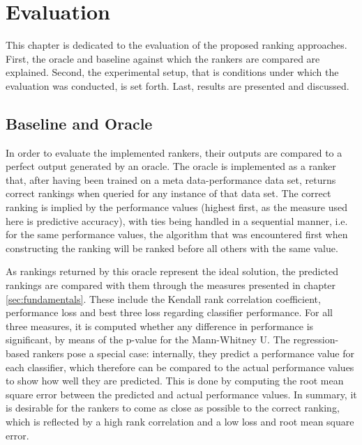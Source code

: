 \chapter{Evaluation}
\label{sec:evaluation}

This chapter is dedicated to the evaluation of the proposed ranking approaches. First, the oracle and baseline against which the rankers are compared are explained. Second, the experimental setup, that is conditions under which the evaluation was conducted, is set forth. Last, results are presented and discussed.

\section{Baseline and Oracle}
In order to evaluate the implemented rankers, their outputs are compared to a perfect output generated by an oracle. The oracle is implemented as a ranker that, after having been trained on a meta data-performance data set, returns correct rankings when queried for any instance of that data set. The correct ranking is implied by the performance values (highest first, as the measure used here is predictive accuracy), with ties being handled in a sequential manner, i.e. for the same performance values, the algorithm that was encountered first when constructing the ranking will be ranked before all others with the same value.

As rankings returned by this oracle represent the ideal solution, the predicted rankings are compared with them through the measures presented in chapter \ref{sec:fundamentals}. These include the Kendall rank correlation coefficient, performance loss and best three loss regarding classifier performance. For all three measures, it is computed whether any difference in performance is significant, by means of the p-value for the Mann-Whitney U. The regression-based rankers pose a special case: internally, they predict a performance value for each classifier, which therefore can be compared to the actual performance values to show how well they are predicted. This is done by computing the root mean square error between the predicted and actual performance values. In summary, it is desirable for the rankers to come as close as possible to the correct ranking, which is reflected by a high rank correlation and a low loss and root mean square error.

